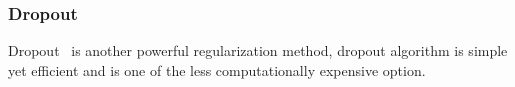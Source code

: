 \subsubsection{Dropout}

Dropout~\cite{JMLR:v15:srivastava14a} is another powerful regularization method, dropout algorithm is simple yet efficient and is one of the less computationally expensive option. 